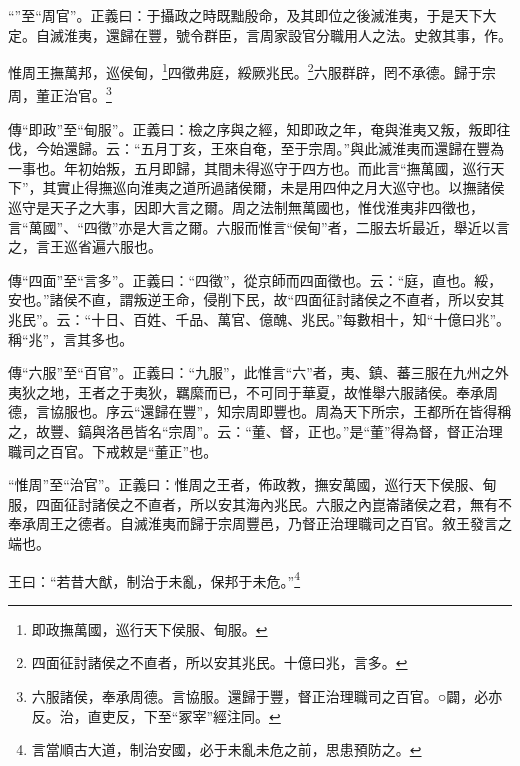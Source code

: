{\noindent\shu{}\fzkt “”至“周官”。正義曰：于攝政之時既黜殷命，及其即位之後滅淮夷，于是天下大定。自滅淮夷，還歸在豐，號令群臣，言周家設官分職用人之法。史敘其事，作。 \par}

惟周王撫萬邦，巡侯甸，\footnote{即政撫萬國，巡行天下侯服、甸服。}四徵弗庭，綏厥兆民。\footnote{四面征討諸侯之不直者，所以安其兆民。十億曰兆，言多。}六服群辟，罔不承德。歸于宗周，董正治官。\footnote{六服諸侯，奉承周德。言協服。還歸于豐，督正治理職司之百官。○闢，必亦反。治，直吏反，下至“冢宰”經注同。}


{\noindent\zhuan{}\fzbyks 傳“即政”至“甸服”。正義曰：檢之序與之經，知即政之年，奄與淮夷又叛，叛即往伐，今始還歸。云：“五月丁亥，王來自奄，至于宗周。”與此滅淮夷而還歸在豐為一事也。年初始叛，五月即歸，其間未得巡守于四方也。而此言“撫萬國，巡行天下”，其實止得撫巡向淮夷之道所過諸侯爾，未是用四仲之月大巡守也。以撫諸侯巡守是天子之大事，因即大言之爾。周之法制無萬國也，惟伐淮夷非四徵也，言“萬國”、“四徵”亦是大言之爾。六服而惟言“侯甸”者，二服去圻最近，舉近以言之，言王巡省遍六服也。 \par}

{\noindent\zhuan{}\fzbyks 傳“四面”至“言多”。正義曰：“四徵”，從京師而四面徵也。云：“庭，直也。綏，安也。”諸侯不直，謂叛逆王命，侵削下民，故“四面征討諸侯之不直者，所以安其兆民”。云：“十日、百姓、千品、萬官、億醜、兆民。”每數相十，知“十億曰兆”。稱“兆”，言其多也。 \par}

{\noindent\zhuan{}\fzbyks 傳“六服”至“百官”。正義曰：“九服”，此惟言“六”者，夷、鎮、蕃三服在九州之外夷狄之地，王者之于夷狄，羈縻而已，不可同于華夏，故惟舉六服諸侯。奉承周德，言協服也。序云“還歸在豐”，知宗周即豐也。周為天下所宗，王都所在皆得稱之，故豐、鎬與洛邑皆名“宗周”。云：“董、督，正也。”是“董”得為督，督正治理職司之百官。下戒敕是“董正”也。 \par}

{\noindent\shu{}\fzkt “惟周”至“治官”。正義曰：惟周之王者，佈政教，撫安萬國，巡行天下侯服、甸服，四面征討諸侯之不直者，所以安其海內兆民。六服之內崑崙諸侯之君，無有不奉承周王之德者。自滅淮夷而歸于宗周豐邑，乃督正治理職司之百官。敘王發言之端也。 \par}

王曰：“若昔大猷，制治于未亂，保邦于未危。”\footnote{言當順古大道，制治安國，必于未亂未危之前，思患預防之。}

